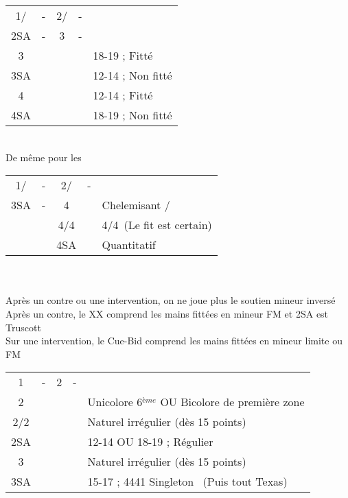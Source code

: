 \documentclass[a4paper, oneside, 11pt]{report}
\begin{document}
		\begin{tabular}{cccc|l}
		1\trefle/\carreau & - & 2\trefle/\carreau & - &\\
		2SA & - & 3\carreau & - &\\
		3\coeur &&&& 18-19 ; Fitté\\
		3SA &&&& 12-14 ; Non fitté\\
		4\coeur &&&& 12-14 ; Fitté\\
		4SA &&&& 18-19 ; Non fitté\\
		\end{tabular}\\
		De même pour les \pique\\

		\begin{tabular}{cccc|l}
		1\trefle/\carreau & - & 2\trefle/\carreau & - &\\
		3SA & - & 4\trefle && Chelemisant \trefle/\carreau\\
		&& 4\carreau/4\coeur && 4\coeur/4\pique\ (Le fit est certain)\\
		&& 4SA && Quantitatif\\
		\end{tabular}\\\\

		Après un contre ou une intervention, on ne joue plus le soutien mineur inversé\\
		Après un contre, le XX comprend les mains fittées en mineur FM et 2SA est Truscott\\
		Sur une intervention, le Cue-Bid comprend les mains fittées en mineur limite ou FM\\

\newpage
		\begin{tabular}{cccc|l}
		1\carreau & - & 2\trefle & - &\\
		2\carreau &&&& Unicolore 6$^{ème}$ OU Bicolore de première zone\\
		2\coeur/2\pique &&&& Naturel irrégulier (dès 15 points) \\
		2SA &&&& 12-14 OU 18-19 ; Régulier\\
		3\trefle &&&& Naturel irrégulier (dès 15 points)\\
		3SA &&&& 15-17 ; 4441 Singleton \trefle\ (Puis tout Texas)\\
		\end{tabular}\\\\
\end{document}
